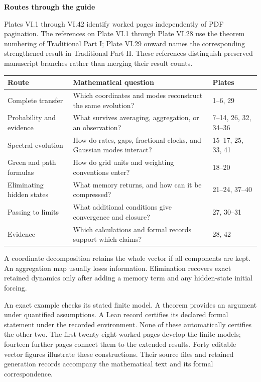 
{\sffamily\bfseries\Large\color{accent}Routes through the guide\par}\vspace{12pt}
Plates VI.1 through VI.42 identify worked pages independently of PDF pagination. The references on Plate VI.1 through Plate VI.28 use the theorem numbering of Traditional Part I; Plate VI.29 onward names the corresponding strengthened result in Traditional Part II. These references distinguish preserved manuscript branches rather than merging their result counts.
\begin{center}\small
\begin{tabularx}{\linewidth}{@{}p{1.6in}Yl@{}}\toprule
Route & Mathematical question & Plates\\\midrule
Complete transfer & Which coordinates and modes reconstruct the same evolution? & 1--6, 29\\
Probability and evidence & What survives averaging, aggregation, or an observation? & 7--14, 26, 32, 34--36\\
Spectral evolution & How do rates, gaps, fractional clocks, and Gaussian modes interact? & 15--17, 25, 33, 41\\
Green and path formulas & How do grid units and weighting conventions enter? & 18--20\\
Eliminating hidden states & What memory returns, and how can it be compressed? & 21--24, 37--40\\
Passing to limits & What additional conditions give convergence and closure? & 27, 30--31\\
Evidence & Which calculations and formal records support which claims? & 28, 42\\\bottomrule
\end{tabularx}
\end{center}
A coordinate decomposition retains the whole vector if all components are kept. An aggregation map usually loses information. Elimination recovers exact retained dynamics only after adding a memory term and any hidden-state initial forcing.

An exact example checks its stated finite model. A theorem provides an argument under quantified assumptions. A Lean record certifies its declared formal statement under the recorded environment. None of these automatically certifies the other two.
The first twenty-eight worked pages develop the finite models; fourteen further pages connect them to the extended results. Forty editable vector figures illustrate these constructions. Their source files and retained generation records accompany the mathematical text and its formal correspondence.

